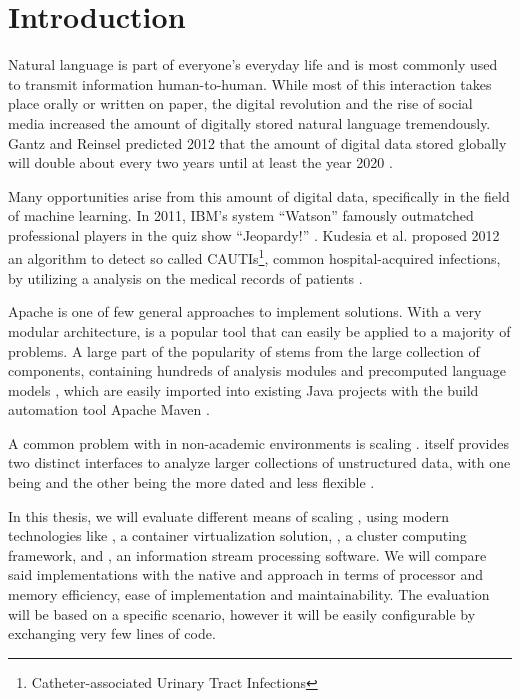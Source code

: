 \chapter{Introduction}

Natural language is part of everyone's everyday life and is most commonly used to transmit information human-to-human. While most of this interaction takes place orally or written on paper, the digital revolution and the rise of social media increased the amount of digitally stored natural language tremendously. Gantz and Reinsel predicted 2012 that the amount of digital data stored globally will double about every two years until at least the year 2020 \cite{gantz2012digital}.

Many opportunities arise from this amount of digital data, specifically in the field of machine learning. In 2011, IBM's \qa{} system ``Watson'' famously outmatched professional players in the quiz show ``Jeopardy!'' \cite{ferrucci2012introduction,epstein2012making}. Kudesia et al. proposed 2012 an algorithm to detect so called CAUTIs\footnote{Catheter-associated Urinary Tract Infections}, common hospital-acquired infections, by utilizing a \nlp{} analysis on the medical records of patients \cite{kudesia2012natural}.

Apache \uima{} is one of few general approaches to implement \nlp{} solutions. With a very modular architecture, \uima{} is a popular tool that can easily be applied to a majority of \nlp{} problems. A large part of the popularity of \uima{} stems from the large \dkpro{} collection of components, containing hundreds of analysis modules and precomputed language models \cite{eckartdecastilho-gurevych:2014:OIAF4HLT}, which are easily imported into existing Java projects with the build automation tool Apache Maven \cite{dkpro}.

A common problem with \uima{} in non-academic environments is scaling \cite{divita2015scaling,epstein2012making,ramakrishnan2010building}. \uima{} itself provides two distinct interfaces to analyze larger collections of unstructured data, with one being \uimaas{} and the other being the more dated and less flexible \cpe{} \cite{OASIS:UIMA:2009}.

In this thesis, we will evaluate different means of scaling \uima{}, using modern technologies like \docker{}, a container virtualization solution, \spark{}, a cluster computing framework, and \kafka{}, an information stream processing software. We will compare said implementations with the native \uimaas{} and \cpe{} approach in terms of processor and memory efficiency, ease of implementation and maintainability. The evaluation will be based on a specific scenario, however it will be easily configurable by exchanging very few lines of code.


